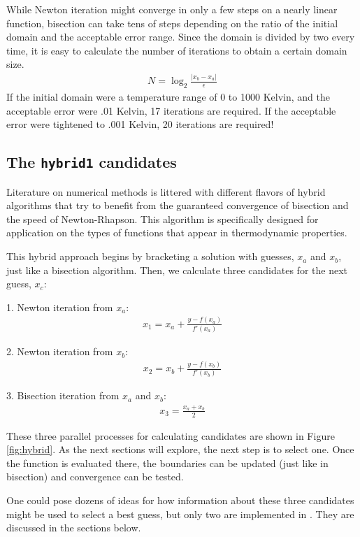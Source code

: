 While Newton iteration might converge in only a few steps on a nearly linear function, bisection can take tens of steps depending on the ratio of the initial domain and the acceptable error range.  Since the domain is divided by two every time, it is easy to calculate the number of iterations to obtain a certain domain size.
\begin{align}
N = \log_2 \frac{|x_b - x_a|}{\epsilon}
\end{align}
If the initial domain were a temperature range of 0 to 1000 Kelvin, and the acceptable error were .01 Kelvin, 17 iterations are required.  If the acceptable error were tightened to .001 Kelvin, 20 iterations are required!

\subsection{The \texttt{hybrid1} candidates}

Literature on numerical methods is littered with different flavors of hybrid algorithms that try to benefit from the guaranteed convergence of bisection and the speed of Newton-Rhapson.  This algorithm is specifically designed for application on the types of functions that appear in thermodynamic properties.

This hybrid approach begins by bracketing a solution with guesses, $x_a$ and $x_b$, just like a bisection algorithm.  Then, we calculate three candidates for the next guess, $x_c$:

1. Newton iteration from $x_a$: 
\begin{align}
x_1 = x_a + \frac{y-f(x_a)}{f'(x_a)}
\end{align}

2. Newton iteration from $x_b$:
\begin{align}
x_2 = x_b + \frac{y-f(x_b)}{f'(x_b)}
\end{align}

3. Bisection iteration from $x_a$ and $x_b$:
\begin{align}
x_3 = \frac{x_a + x_b}{2}
\end{align}

These three parallel processes for calculating candidates are shown in Figure \ref{fig:hybrid}.  As the next sections will explore, the next step is to select one.  Once the function is evaluated there, the boundaries can be updated (just like in bisection) and convergence can be tested.

One could pose dozens of ideas for how information about these three candidates might be used to select a best guess, but only two are implemented in \PM.  They are discussed in the sections below.

